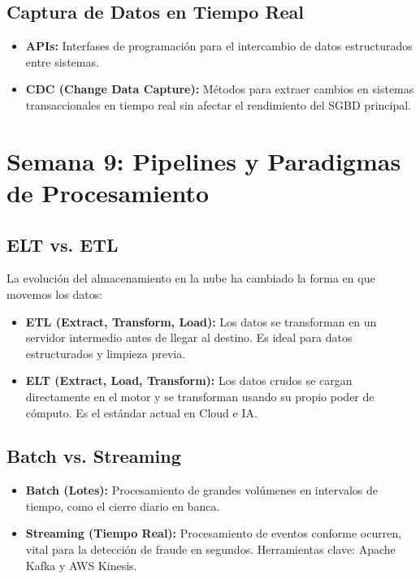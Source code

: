 \documentclass[12pt,a4paper,openany,oneside]{book}
\begin{document}
\subsection{Captura de Datos en Tiempo Real}
\begin{itemize}
    \item \textbf{APIs:} Interfases de programación para el intercambio de datos estructurados entre sistemas.
    \item \textbf{CDC (Change Data Capture):} Métodos para extraer cambios en sistemas transaccionales en tiempo real sin afectar el rendimiento del SGBD principal.
\end{itemize}



\section{Semana 9: Pipelines y Paradigmas de Procesamiento}

\subsection{ELT vs. ETL}
La evolución del almacenamiento en la nube ha cambiado la forma en que movemos los datos:
\begin{itemize}
    \item \textbf{ETL (Extract, Transform, Load):} Los datos se transforman en un servidor intermedio antes de llegar al destino. Es ideal para datos estructurados y limpieza previa.
    \item \textbf{ELT (Extract, Load, Transform):} Los datos crudos se cargan directamente en el motor y se transforman usando su propio poder de cómputo. Es el estándar actual en Cloud e IA.
\end{itemize}

\subsection{Batch vs. Streaming}
\begin{itemize}
    \item \textbf{Batch (Lotes):} Procesamiento de grandes volúmenes en intervalos de tiempo, como el cierre diario en banca.
    \item \textbf{Streaming (Tiempo Real):} Procesamiento de eventos conforme ocurren, vital para la detección de fraude en segundos. Herramientas clave: Apache Kafka y AWS Kinesis.
\end{itemize}
\end{document}
